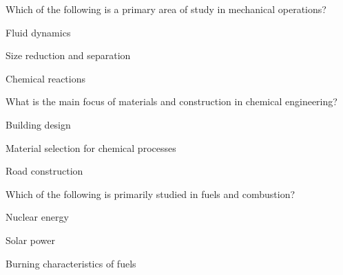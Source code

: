 \begin{enhancedmcq}{Which of the following is a primary area of study in mechanical operations?}
\item Fluid dynamics
\item Size reduction and separation
\item Chemical reactions

\end{enhancedmcq}
\begin{enhancedmcq}{What is the main focus of materials and construction in chemical engineering?}
\item Building design
\item Material selection for chemical processes
\item Road construction

\end{enhancedmcq}
\begin{enhancedmcq}{Which of the following is primarily studied in fuels and combustion?}
\item Nuclear energy
\item Solar power
\item Burning characteristics of fuels
\end{enhancedmcq}